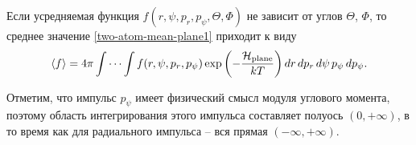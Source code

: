 Если усредняемая функция $f(r, \psi, p_r, p_\psi, \Theta, \Phi)$ не зависит от углов $\Theta$, $\Phi$, то среднее значение  \eqref{two-atom-mean-plane1} приходит к виду
\begin{gather}
    \langle f \rangle = 4 \pi \idotsint f(r, \psi, p_r, p_\psi) \exp \left( -\frac{\mathcal{H}_\text{plane}}{kT} \right) dr \, dp_r \, d\psi \, p_\psi \, dp_\psi. 
\end{gather}

Отметим, что импульс $p_\psi$ имеет физический смысл модуля углового момента, поэтому область интегрирования этого импульса составляет полуось $(0, +\infty)$, в то время как для радиального импульса -- вся прямая $(-\infty, +\infty)$. 
